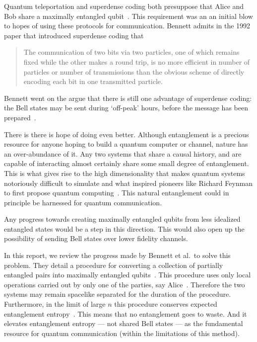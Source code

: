 Quantum teleportation and superdense coding both presuppose that Alice and Bob share a maximally entangled qubit~\cite{barrett2004teleportation, bennett1992superdense}. 
This requirement was an an initial blow to hopes of using these protocols for communication.
Bennett admits in the 1992 paper that introduced superdense coding that

\hyphenblockcquote{UKenglish}{bennett1992superdense}{
The communication of two bits via two particles, one of which remains fixed while the other makes a round trip, is no more efficient in number of particles or number of transmissions than the obvious scheme of directly encoding each bit in one transmitted particle.
}

Bennett went on the argue that there is still one advantage of superdense coding: the Bell states may be sent during `off-peak' hours, before the message has been prepared~\cite{bennett1992superdense}.

There is there is hope of doing even better.
Although entanglement is a precious resource for anyone hoping to build a quantum computer or channel, nature has an over-abundance of it. 
Any two systems that share a causal history, and are capable of interacting almost certainly share some small degree of entanglement.
This is what gives rise to the high dimensionality that makes quantum systems notoriously difficult to simulate and what inspired pioneers like Richard Feynman to first propose quantum computing~\cite{feynman1982simulating}.
This natural entanglement could in principle be harnessed for quantum communication.

Any progress towards creating maximally entangled qubits from less idealized entangled states would be a step in this direction.
This would also open up the possibility of sending Bell states over lower fidelity channels.

In this report, we review the progress made by Bennett et al.\ to solve this problem.
They detail a procedure for converting a collection of partially entangled pairs into maximally entangled qubits~\cite{bennett1996concentrating}.
This procedure uses only local operations carried out by only one of the parties, say Alice~\cite{bennett1996concentrating}.
Therefore the two systems may remain spacelike separated for the duration of the procedure.
Furthermore, in the limit of large $n$ this procedure conserves expected entanglement entropy~\cite{bennett1996concentrating}.
This means that no entanglement goes to waste.
And it elevates entanglement entropy --- not shared Bell states --- as the fundamental resource for quantum communication (within the limitations of this method).

